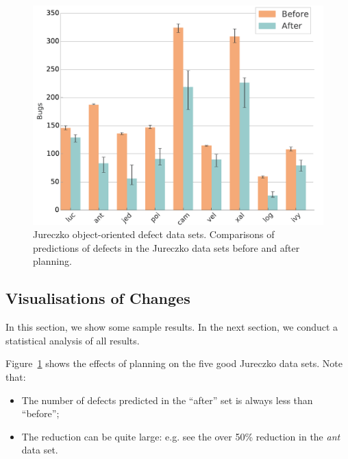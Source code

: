 \documentclass[conference]{IEEEtran}
\newcommand{\bi}{\begin{itemize}}
\newcommand{\ei}{\end{itemize}}
\newcommand{\fig}[1]{Figure~\ref{fig:#1}}
\begin{document}
  




\begin{figure}[tbp]
\centering
\includegraphics[width=\linewidth]{_figs/histograms.pdf}
\caption{Jureczko object-oriented defect data sets. 
Comparisons of predictions of defects in the Jureczko data sets before and after planning.}
\label{fig:bugs}
\end{figure}

\subsection{Visualisations of Changes}

In this section, we show some sample results. In the next section, we conduct a statistical
analysis of all   results.

\fig{bugs} shows the effects of planning on the five good Jureczko data sets. Note that:
\bi
\item
The number of defects predicted in the ``after'' set is always less than ``before'';
\item
The reduction can be quite large: e.g. see the over 50\% reduction in the {\em ant} data set.
\ei
\end{document}
